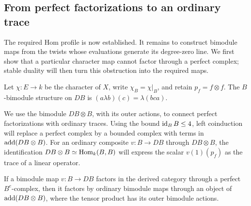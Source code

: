 \subsection{From perfect factorizations to an ordinary trace}

The required Hom profile is now established. It remains to construct
bimodule maps from the twists whose evaluations generate its degree-zero
line. We first show that a particular character map cannot factor
through a perfect complex; stable duality will then turn this
obstruction into the required maps.

Let \(\chi:E\to k\) be the character of \(X\), write
\(\chi_B=\chi|_B\), and retain \(p_f=f\otimes f\).
The \(B\)-bimodule structure on \(DB\) is
\((a\lambda b)(c)=\lambda(bca)\).

We use the bimodule \(DB\otimes B\), with its outer actions, to connect
perfect factorizations with ordinary traces. Using the bound
\(\operatorname{id}_B B\leq4\), left coinduction will replace a perfect complex by
a bounded complex with terms in \(\operatorname{add}(DB\otimes B)\). For an ordinary
composite \(v:B\to DB\) through \(DB\otimes B\), the identification
\(DB\otimes B\simeq\operatorname{Hom}_k(B,B)\) will express the scalar \(v(1)(p_f)\)
as the trace of a linear operator.

\begin{lemma}\label{b:ordinary-factorization}
If a bimodule map \(v:B\to DB\) factors in the derived category
through a perfect \(B^e\)-complex, then it factors by ordinary
bimodule maps through an object of \(\operatorname{add}(DB\otimes B)\), where the
tensor product has its outer bimodule actions.
\end{lemma}

